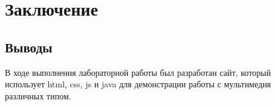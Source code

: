 \chapter{Заключение}

\section{Выводы}

В ходе выполнения лабораторной работы был разработан сайт, который использует html, css, js и java для демонстрации работы с мультимедия различных типом.